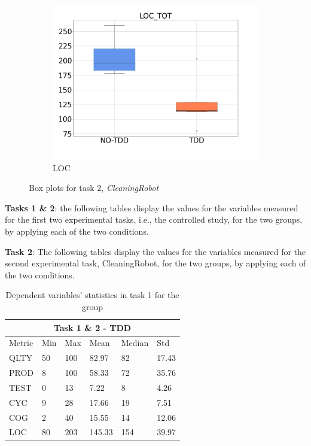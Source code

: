 \begin{figure}[H]
\begin{subfigure}{0.33\textwidth}
        \includegraphics[width=\linewidth]{figures/box_plots/task2/LOC.png}
        \caption{LOC}
        \label{bp_task2_loc}
    \end{subfigure}
    \caption{Box plots for task 2, \textit{CleaningRobot}}
    \label{box_plots_task2}
\end{figure}





\textbf{Tasks 1 \& 2}: the following tables display the values for the variables measured for the first two experimental tasks, i.e., the controlled study, for the two groups, by applying each of the two conditions.

\noindent \textbf{Task 2}: The following tables display the values for the variables measured for the second experimental task, CleaningRobot, for the two groups, by applying each of the two conditions.
\begin{table}[!h]
    \begin{center} 
        \begin{tabular}{ |p{2cm}||p{1.6cm}|p{1.6cm}|p{1.6cm}|p{1.6cm}|p{1.6cm}|}
            \hline
                \multicolumn{6}{|c|}{Task 1 \& 2 - TDD} \\
            \hline
                Metric & Min & Max & Mean & Median & Std\\
            \hline
                QLTY & 50 & 100 & 82.97 & 82 & 17.43 \\
                PROD & 8 & 100 & 58.33 & 72 & 35.76 \\
                TEST & 0 & 13 & 7.22 & 8 & 4.26 \\
                CYC & 9 & 28 & 17.66 & 19 & 7.51 \\
                COG & 2 & 40 & 15.55 & 14 & 12.06 \\
                LOC & 80 & 203 & 145.33 & 154 & 39.97 \\
            \hline
        \end{tabular}
        \caption{\label{tab_dv_t1_2_tdd}Dependent variables' statistics in task 1 for the \tdd group}
    \end{center}
\end{table}


